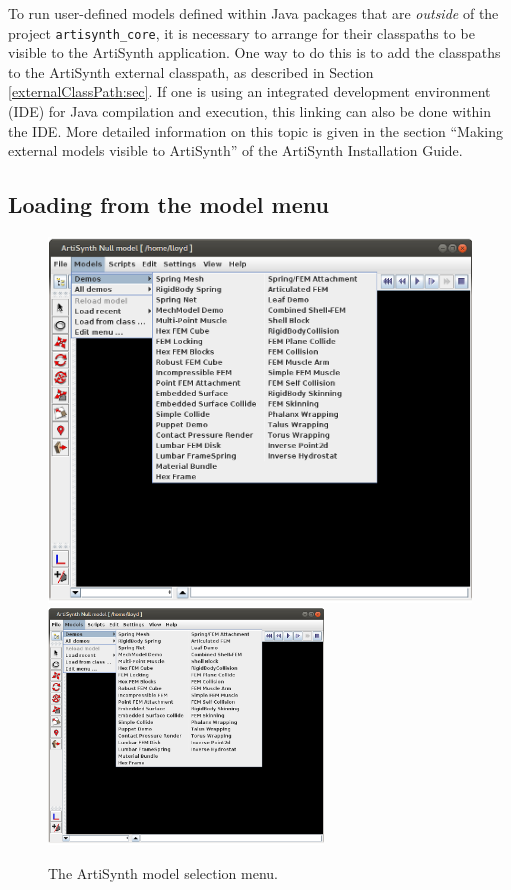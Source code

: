 \documentclass{article}
\begin{document}
To run user-defined models defined within Java packages that are {\it
outside} of the project {\tt artisynth\_core}, it is necessary to
arrange for their classpaths to be visible to the ArtiSynth
application. One way to do this is to add the classpaths to the
ArtiSynth external classpath, as described in Section
\ref{externalClassPath:sec}. If one is using an integrated development
environment (IDE) for Java compilation and execution, this linking can
also be done within the IDE.  More detailed information on this topic
is given in the section ``Making external models visible to
ArtiSynth'' of the ArtiSynth Installation Guide.

\subsection{Loading from the model menu}
\label{LoadingFromModelMenu}

\begin{figure}[ht]
\begin{center}
\iflatexml
   \includegraphics[]{images/ArtiSynthDemoMenu}
\else
   \includegraphics[width=0.65\textwidth]{images/ArtiSynthDemoMenu}
\fi
\end{center}
\caption{The ArtiSynth model selection menu.}
\label{ModelSelectionMenu:fig}
\end{figure}
\end{document}
